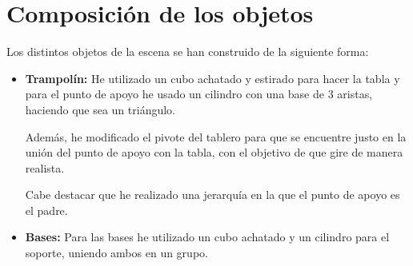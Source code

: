 \section{Composición de los objetos}

Los distintos objetos de la escena se han construido de la siguiente forma:

\begin{itemize}
    \item \textbf{Trampolín: }He utilizado un cubo achatado y estirado para hacer la tabla y para el punto de apoyo he usado un cilindro con una base de 3 aristas, haciendo que sea un triángulo.
    
    Además, he modificado el pivote del tablero para que se encuentre justo en la unión del punto de apoyo con la tabla, con el objetivo de que gire de manera realista.

    Cabe destacar que he realizado una jerarquía en la que el punto de apoyo es el padre.

    \item \textbf{Bases: }Para las bases he utilizado un cubo achatado y un cilindro para el soporte, uniendo ambos en un grupo.
\end{itemize}